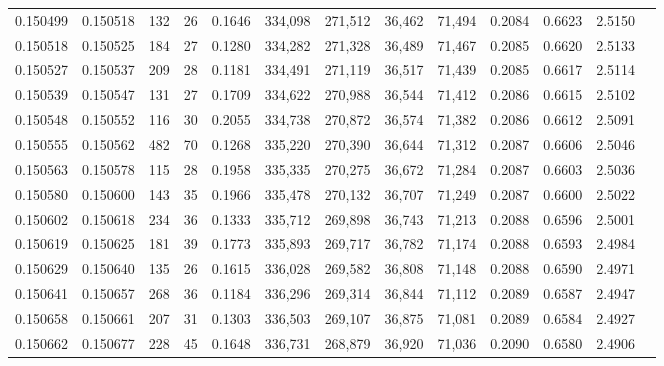 \begin{tabular}{rrrrrrrrrrrrr}
0.150499 & 0.150518 &   132 &  26 &                                     0.1646 & 334,098 & 271,512 &  36,462 &  71,494 & 0.2084 & 0.6623 & 2.5150 \\
0.150518 & 0.150525 &   184 &  27 &                                     0.1280 & 334,282 & 271,328 &  36,489 &  71,467 & 0.2085 & 0.6620 & 2.5133 \\
0.150527 & 0.150537 &   209 &  28 &                                     0.1181 & 334,491 & 271,119 &  36,517 &  71,439 & 0.2085 & 0.6617 & 2.5114 \\
0.150539 & 0.150547 &   131 &  27 &                                     0.1709 & 334,622 & 270,988 &  36,544 &  71,412 & 0.2086 & 0.6615 & 2.5102 \\
0.150548 & 0.150552 &   116 &  30 &                                     0.2055 & 334,738 & 270,872 &  36,574 &  71,382 & 0.2086 & 0.6612 & 2.5091 \\
0.150555 & 0.150562 &   482 &  70 &                                     0.1268 & 335,220 & 270,390 &  36,644 &  71,312 & 0.2087 & 0.6606 & 2.5046 \\
0.150563 & 0.150578 &   115 &  28 &                                     0.1958 & 335,335 & 270,275 &  36,672 &  71,284 & 0.2087 & 0.6603 & 2.5036 \\
0.150580 & 0.150600 &   143 &  35 &                                     0.1966 & 335,478 & 270,132 &  36,707 &  71,249 & 0.2087 & 0.6600 & 2.5022 \\
0.150602 & 0.150618 &   234 &  36 &                                     0.1333 & 335,712 & 269,898 &  36,743 &  71,213 & 0.2088 & 0.6596 & 2.5001 \\
0.150619 & 0.150625 &   181 &  39 &                                     0.1773 & 335,893 & 269,717 &  36,782 &  71,174 & 0.2088 & 0.6593 & 2.4984 \\
0.150629 & 0.150640 &   135 &  26 &                                     0.1615 & 336,028 & 269,582 &  36,808 &  71,148 & 0.2088 & 0.6590 & 2.4971 \\
0.150641 & 0.150657 &   268 &  36 &                                     0.1184 & 336,296 & 269,314 &  36,844 &  71,112 & 0.2089 & 0.6587 & 2.4947 \\
0.150658 & 0.150661 &   207 &  31 &                                     0.1303 & 336,503 & 269,107 &  36,875 &  71,081 & 0.2089 & 0.6584 & 2.4927 \\
0.150662 & 0.150677 &   228 &  45 &                                     0.1648 & 336,731 & 268,879 &  36,920 &  71,036 & 0.2090 & 0.6580 & 2.4906 \\

\end{tabular}
